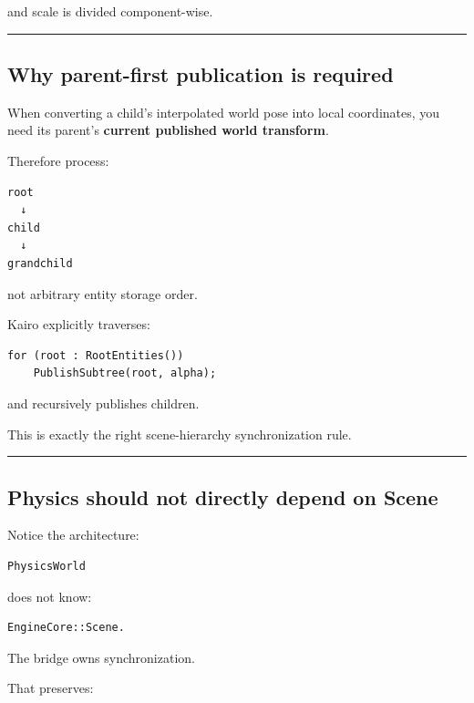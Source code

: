 and scale is divided component-wise.

\begin{center}\rule{0.5\linewidth}{0.5pt}\end{center}

\subsection{Why parent-first publication is required}\label{06-engine-ii-ch037-why-parent-first-publication-is-required}

When converting a child's interpolated world pose into local coordinates, you need its parent's \textbf{current published world transform}.

Therefore process:

\begin{verbatim}
root
  ↓
child
  ↓
grandchild
\end{verbatim}

not arbitrary entity storage order.

Kairo explicitly traverses:

\begin{verbatim}
for (root : RootEntities())
    PublishSubtree(root, alpha);
\end{verbatim}

and recursively publishes children.

This is exactly the right scene-hierarchy synchronization rule.

\begin{center}\rule{0.5\linewidth}{0.5pt}\end{center}

\subsection{Physics should not directly depend on Scene}\label{06-engine-ii-ch037-physics-should-not-directly-depend-on-scene}

Notice the architecture:

\begin{verbatim}
PhysicsWorld
\end{verbatim}

does not know:

\begin{verbatim}
EngineCore::Scene.
\end{verbatim}

The bridge owns synchronization.

That preserves:

